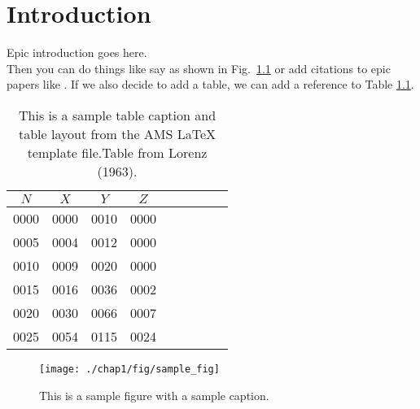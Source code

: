 \chapter{Introduction}
Epic introduction goes here.\\

Then you can do things like say as shown in Fig.\ \ref{fig:sample}
or add citations to epic papers like \cite{eliassen1951}. If we also decide
to add a table, we can add a reference to Table \ref{tab:lorenz}.

\begin{table}[t]
\caption[This caption appears in the LoT]{This is a sample table caption and
  table layout from the AMS LaTeX template file.Table from Lorenz (1963).}
\label{tab:lorenz}
\begin{center}
\begin{tabular}{ccccrrcrc}
\hline\hline
$N$ & $X$ & $Y$ & $Z$\\
\hline
 0000 & 0000 & 0010 & 0000 \\
 0005 & 0004 & 0012 & 0000 \\
 0010 & 0009 & 0020 & 0000 \\
 0015 & 0016 & 0036 & 0002 \\
 0020 & 0030 & 0066 & 0007 \\
 0025 & 0054 & 0115 & 0024 \\
\hline
\end{tabular}
\end{center}
\end{table}

\begin{figure}[H]
    \centering
    \texttt{[image: ./chap1/fig/sample\_fig]}
    \caption[This caption is only in the LoF]{This is a sample figure with a
    sample caption.}
    \label{fig:sample}
\end{figure}

